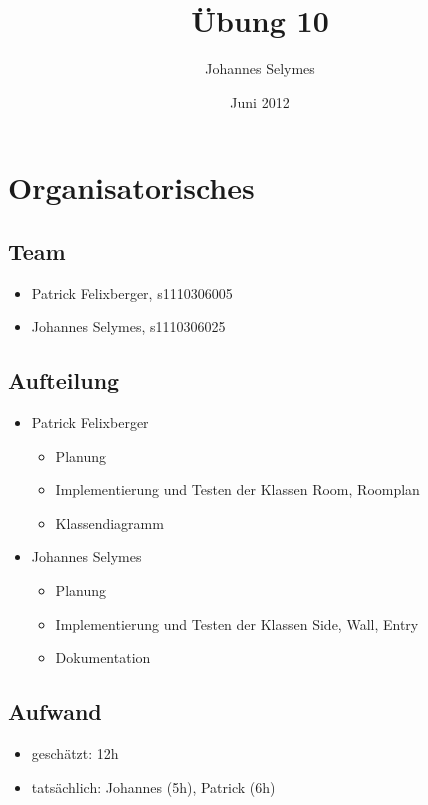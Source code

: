 \documentclass[12pt,a4paper]{article}
\begin{document}
\title{Übung 10}
\author{Johannes Selymes}
\date{Juni 2012}

\normalsize

\newcommand{\CodePath}{../../Raumplan/Raumplan/}

\section{Organisatorisches}

\subsection{Team}
	\begin {itemize} 
		\item Patrick Felixberger, s1110306005 
		\item Johannes Selymes, s1110306025
	\end {itemize}

\subsection{Aufteilung}
	\begin {itemize} 
		\item Patrick Felixberger
			\begin {itemize}
				\item Planung
				\item Implementierung und Testen der Klassen Room, Roomplan
				\item Klassendiagramm				
			\end {itemize}
		\item Johannes Selymes
			\begin {itemize}
				\item Planung
				\item Implementierung und Testen der Klassen Side, Wall, Entry
				\item Dokumentation				
			\end {itemize}
	\end {itemize}


\subsection{Aufwand}
	\begin {itemize}
		\item geschätzt: 12h
		\item tatsächlich: Johannes (5h), Patrick  (6h)

	\end {itemize}
\end{document}
